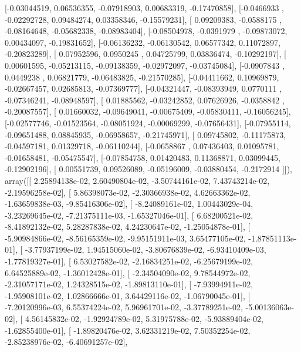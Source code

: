 \documentclass{article}
\begin{document}
       [-0.03044519,  0.06536355, -0.07918903,  0.00683319, -0.17470858],
       [-0.0466933 , -0.02292728,  0.09484274,  0.03358346, -0.15579231],
       [ 0.09209383, -0.0588175 , -0.08164648, -0.05682338, -0.08983404],
       [-0.08504978, -0.0391979 , -0.09873072,  0.00434097, -0.19831652],
       [-0.06136232, -0.06130542,  0.06577342,  0.11072897, -0.20823289],
       [ 0.07952596,  0.0950245 ,  0.04725799,  0.03836474, -0.10292197],
       [ 0.00601595, -0.05213115, -0.09138359, -0.02972097, -0.03745084],
       [-0.0907843 ,  0.0449238 ,  0.06821779, -0.06483825, -0.21570285],
       [-0.04411662,  0.10969879, -0.02667457,  0.02685813, -0.07369777],
       [-0.04321447, -0.08393949,  0.0770111 , -0.07346241, -0.08948597],
       [ 0.01885562, -0.03242852,  0.07626926, -0.0358842 , -0.20087557],
       [ 0.01660032, -0.09649041, -0.00675409, -0.05830411, -0.16056245],
       [-0.02577746, -0.01523564, -0.08051924, -0.00069299, -0.07656431],
       [-0.07955114, -0.09651488,  0.08845935, -0.06958657, -0.21745971],
       [ 0.09745802, -0.11175873, -0.04597181,  0.01329718, -0.06110244],
       [-0.0658867 ,  0.07436403,  0.01095781, -0.01658481, -0.05475547],
       [-0.07854758,  0.01420483,  0.11368871,  0.03099445, -0.12902196],
       [ 0.00551739,  0.09526089, -0.05196009, -0.03880454, -0.2172914 ]]), array([[  2.25894138e-02,   2.60490804e-02,  -3.50744161e-02,
          7.43743214e-02,  -2.19596258e-02],
       [  5.86398073e-02,  -2.30366938e-02,   4.62663362e-02,
         -1.63659838e-03,  -9.85416306e-02],
       [ -8.24089161e-02,   1.00443029e-04,  -3.23269645e-02,
         -7.21375111e-03,  -1.65327046e-01],
       [  6.68200521e-02,  -8.41892132e-02,   5.28287838e-02,
          4.24230647e-02,  -1.25054878e-01],
       [ -5.90984866e-02,  -8.56165359e-02,  -9.95151911e-03,
          3.65477105e-02,  -1.87851113e-01],
       [ -3.77937199e-02,   1.94515060e-02,  -3.80676839e-02,
         -6.93410409e-03,  -1.77819327e-01],
       [  6.53027582e-02,  -2.16834251e-02,  -6.25679199e-02,
          6.64525889e-02,  -1.36012428e-01],
       [ -2.34504090e-02,   9.78544972e-02,  -2.31057171e-02,
          1.24328515e-02,  -1.89813110e-01],
       [ -7.93994911e-02,  -1.95908101e-02,   1.02866666e-01,
          3.64429116e-02,  -1.06790045e-01],
       [ -7.20120996e-03,   6.55374224e-02,   5.96961701e-02,
         -3.37789251e-02,  -5.00136063e-02],
       [  4.56145832e-02,  -1.92924789e-02,   5.31975788e-02,
         -5.93889404e-02,  -1.62855400e-01],
       [ -1.89820476e-02,   3.62331219e-02,   7.50352254e-02,
         -2.85238976e-02,  -6.40691257e-02],
\end{document}
